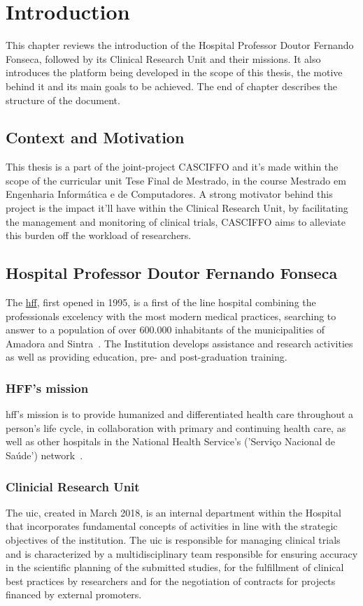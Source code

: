 % 
%
\chapter{Introduction}
\label{ch:intro}
This chapter reviews the introduction of the Hospital Professor Doutor Fernando Fonseca, followed by its Clinical Research Unit and their missions. It also introduces the platform being developed in the scope of this thesis, the motive behind it and its main goals to be achieved. The end of chapter describes the structure of the document.

\section{Context and Motivation}
This thesis is a part of the joint-project CASCIFFO and it's made within the scope of the curricular unit Tese Final de Mestrado, in the course Mestrado em Engenharia Informática e de Computadores. A strong motivator behind this project is the impact it'll have within the Clinical Research Unit, by facilitating the management and monitoring of clinical trials, CASCIFFO aims to alleviate this burden off the workload of researchers.

\section{Hospital Professor Doutor Fernando Fonseca}
\label{ch:intro:sec:intro}

The \href{https://hff.min-saude.pt/}{\acrfull{hff}}, first opened in 1995, is a first of the line hospital combining the professionals excelency with the most modern medical practices, searching to answer to a population of over 600.000 inhabitants of the municipalities of Amadora and Sintra~\cite{hff-intro}. The Institution develops assistance and research activities as well as providing education, pre- and post-graduation training.

\subsection{HFF's mission}
\acrshort{hff}'s mission is to provide humanized and differentiated health
care throughout a person's life cycle, in collaboration with primary and
continuing health care, as well as other hospitals in the National
Health Service's ('Serviço Nacional de Saúde') network~\cite{hff-uic}.

\subsection{Clinicial Research Unit}
The \acrfull{uic}, created in March 2018, is an internal department within the
Hospital that incorporates fundamental concepts of activities in line
with the strategic objectives of the institution. The \acrshort{uic} is responsible
for managing clinical trials and is characterized by a
multidisciplinary team responsible for ensuring accuracy in the
scientific planning of the submitted studies, for the fulfillment of
clinical best practices by researchers and for the negotiation of
contracts for projects financed by external promoters.\\

